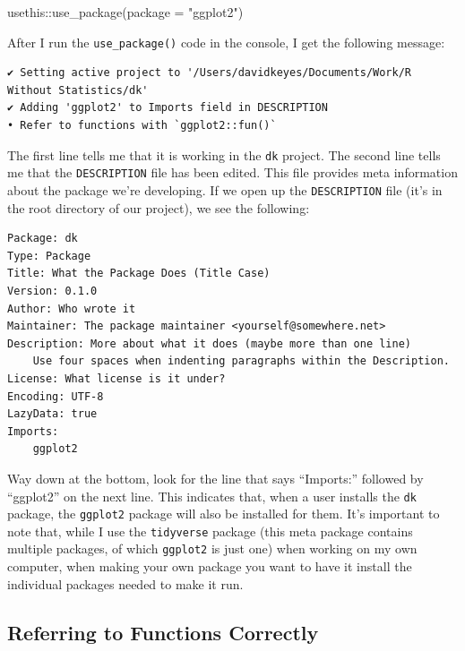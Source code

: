 \documentclass[
]{book}
\newenvironment{Shaded}{\begin{snugshade}}{\end{snugshade}}
\newcommand{\AttributeTok}[1]{\textcolor[rgb]{0.77,0.63,0.00}{#1}}
\newcommand{\FunctionTok}[1]{\textcolor[rgb]{0.00,0.00,0.00}{#1}}
\newcommand{\NormalTok}[1]{#1}
\newcommand{\SpecialCharTok}[1]{\textcolor[rgb]{0.00,0.00,0.00}{#1}}
\newcommand{\StringTok}[1]{\textcolor[rgb]{0.31,0.60,0.02}{#1}}
\begin{document}
\begin{Shaded}
\begin{Highlighting}[]
\NormalTok{usethis}\SpecialCharTok{::}\FunctionTok{use\_package}\NormalTok{(}\AttributeTok{package =} \StringTok{"ggplot2"}\NormalTok{)}
\end{Highlighting}
\end{Shaded}

After I run the \texttt{use\_package()} code in the console, I get the following message:

\begin{verbatim}
✔ Setting active project to '/Users/davidkeyes/Documents/Work/R Without Statistics/dk'
✔ Adding 'ggplot2' to Imports field in DESCRIPTION
• Refer to functions with `ggplot2::fun()`
\end{verbatim}

The first line tells me that it is working in the \texttt{dk} project. The second line tells me that the \texttt{DESCRIPTION} file has been edited. This file provides meta information about the package we're developing. If we open up the \texttt{DESCRIPTION} file (it's in the root directory of our project), we see the following:

\begin{verbatim}
Package: dk
Type: Package
Title: What the Package Does (Title Case)
Version: 0.1.0
Author: Who wrote it
Maintainer: The package maintainer <yourself@somewhere.net>
Description: More about what it does (maybe more than one line)
    Use four spaces when indenting paragraphs within the Description.
License: What license is it under?
Encoding: UTF-8
LazyData: true
Imports:
    ggplot2
\end{verbatim}

Way down at the bottom, look for the line that says ``Imports:'' followed by ``ggplot2'' on the next line. This indicates that, when a user installs the \texttt{dk} package, the \texttt{ggplot2} package will also be installed for them. It's important to note that, while I use the \texttt{tidyverse} package (this meta package contains multiple packages, of which \texttt{ggplot2} is just one) when working on my own computer, when making your own package you want to have it install the individual packages needed to make it run.

\hypertarget{referring-to-functions-correctly}{%
\subsection*{Referring to Functions Correctly}\label{referring-to-functions-correctly}}
\end{document}
